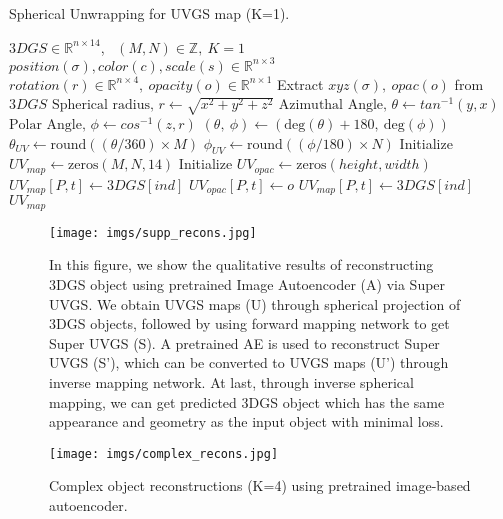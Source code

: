 \begin{algorithm}
\label{algo:spherical}
\caption{Spherical Unwrapping for UVGS map (K=1).}
\begin{algorithmic}[1]
\Require $3DGS \in \mathbb{R}^{n \times 14}$,~ $(M,N) \in \mathbb{Z},~ K=1$
\Ensure $position(\sigma), color(c), scale(s) \in \mathbb{R}^{n \times 3}$
\Ensure $rotation(r) \in \mathbb{R}^{n \times 4},~ opacity(o) \in \mathbb{R}^{n \times 1}$
\State Extract $xyz(\sigma),~opac(o)$ from $3DGS$
\State $ \text{Spherical radius, }r \gets \sqrt{x^2 + y^2 + z^2}$
\State $ \text{Azimuthal Angle, } \theta \gets tan^{-1}(y, x)$
\State $ \text{Polar Angle, } \phi \gets cos^{-1}(z,r)$
\State $(\theta,~ \phi) \gets (\text{deg}(\theta) + 180,~ \text{deg}(\phi))$
\State $\theta_{UV} \gets \text{round}((\theta / 360) \times M)$
\State $\phi_{UV} \gets \text{round}((\phi / 180) \times N)$
\State Initialize $UV_{map} \gets \text{zeros}(M, N, 14)$
\State Initialize $UV_{opac} \gets \text{zeros}(height, width)$
            \State $UV_{map}[P, t] \gets 3DGS[ind]$
            \State $UV_{opac}[P, t] \gets o$
        \Else
                \State $UV_{map}[P, t] \gets 3DGS[ind]$
            \EndIf
        \EndIf
    \EndIf
\EndFor \\
\Return $UV_{map}$
\end{algorithmic}
\end{algorithm}


\begin{figure*}[t]
\centering
\texttt{[image: imgs/supp\_recons.jpg]} 
\caption{
In this figure, we show the qualitative results of reconstructing 3DGS object using pretrained Image Autoencoder (A) via Super UVGS. We obtain UVGS maps (U) through spherical projection of 3DGS objects, followed by using forward mapping network to get Super UVGS (S). A pretrained AE is used to reconstruct Super UVGS (S'), which can be converted to UVGS maps (U') through inverse mapping network. At last, through inverse spherical mapping, we can get predicted 3DGS object which has the same appearance and geometry as the input object with minimal loss.
}
\label{fig:supp_recons}
\end{figure*}


\begin{figure*}[t]
\centering
\texttt{[image: imgs/complex\_recons.jpg]} 
\vspace{-0.3cm}
\caption{
Complex object reconstructions (K=4) using pretrained image-based autoencoder.
}
\vspace{-0.6cm}
\label{fig:supp_complex_recons}
\end{figure*}


